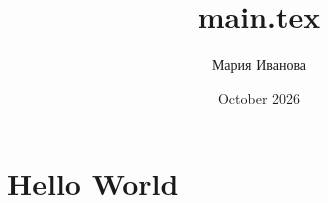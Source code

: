 \documentclass{article}
\title{main.tex}
\author{Мария Иванова}
\date{October 2026}
\begin{document}
\section*{Hello World}
\end{document}

